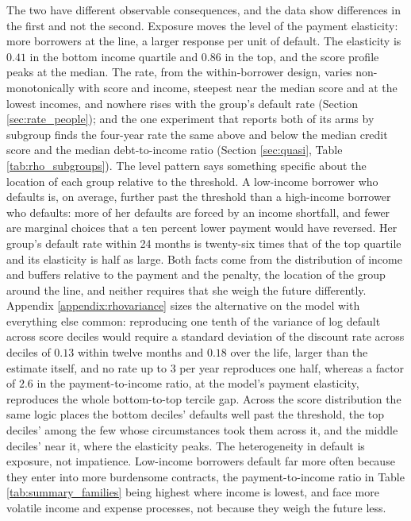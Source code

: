 The two have different observable consequences, and the data show differences in the first and not the second. Exposure moves the level of the payment elasticity: more borrowers at the line, a larger response per unit of default. The elasticity is $0.41$ in the bottom income quartile and $0.86$ in the top, and the score profile peaks at the median. The rate, from the within-borrower design, varies non-monotonically with score and income, steepest near the median score and at the lowest incomes, and nowhere rises with the group's default rate (Section \ref{sec:rate_people}); and the one experiment that reports both of its arms by subgroup finds the four-year rate the same above and below the median credit score and the median debt-to-income ratio (Section \ref{sec:quasi}, Table \ref{tab:rho_subgroups}). The level pattern says something specific about the location of each group relative to the threshold. A low-income borrower who defaults is, on average, further past the threshold than a high-income borrower who defaults: more of her defaults are forced by an income shortfall, and fewer are marginal choices that a ten percent lower payment would have reversed. Her group's default rate within 24 months is twenty-six times that of the top quartile and its elasticity is half as large. Both facts come from the distribution of income and buffers relative to the payment and the penalty, the location of the group around the line, and neither requires that she weigh the future differently. Appendix \ref{appendix:rhovariance} sizes the alternative on the model with everything else common: reproducing one tenth of the variance of log default across score deciles would require a standard deviation of the discount rate across deciles of $0.13$ within twelve months and $0.18$ over the life, larger than the estimate itself, and no rate up to $3$ per year reproduces one half, whereas a factor of $2.6$ in the payment-to-income ratio, at the model's payment elasticity, reproduces the whole bottom-to-top tercile gap. Across the score distribution the same logic places the bottom deciles' defaults well past the threshold, the top deciles' among the few whose circumstances took them across it, and the middle deciles' near it, where the elasticity peaks. The heterogeneity in default is exposure, not impatience. Low-income borrowers default far more often because they enter into more burdensome contracts, the payment-to-income ratio in Table \ref{tab:summary_families} being highest where income is lowest, and face more volatile income and expense processes, not because they weigh the future less.
